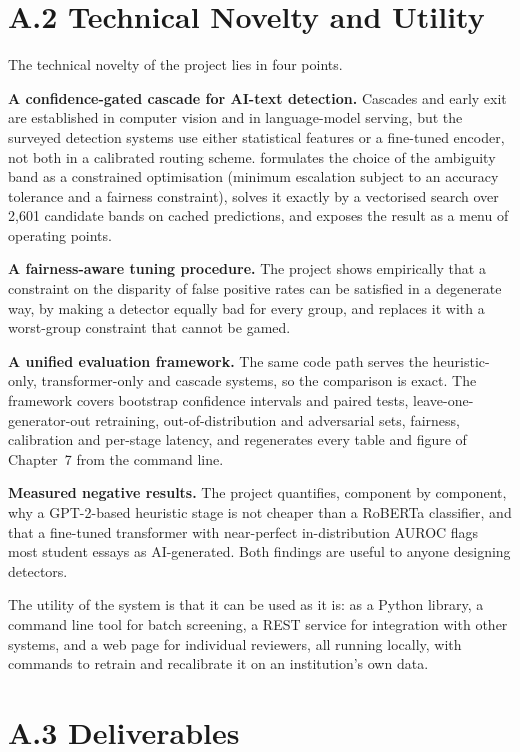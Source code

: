 \section*{A.2 Technical Novelty and Utility}

The technical novelty of the project lies in four points.

\textbf{A confidence-gated cascade for AI-text detection.} Cascades and early
exit are established in computer vision and in language-model serving, but the
surveyed detection systems use either statistical features or a fine-tuned
encoder, not both in a calibrated routing scheme. \veriscript{} formulates the
choice of the ambiguity band as a constrained optimisation (minimum escalation
subject to an accuracy tolerance and a fairness constraint), solves it exactly
by a vectorised search over 2,601 candidate bands on cached predictions, and
exposes the result as a menu of operating points.

\textbf{A fairness-aware tuning procedure.} The project shows empirically that a
constraint on the disparity of false positive rates can be satisfied in a
degenerate way, by making a detector equally bad for every group, and replaces
it with a worst-group constraint that cannot be gamed.

\textbf{A unified evaluation framework.} The same code path serves the
heuristic-only, transformer-only and cascade systems, so the comparison is exact.
The framework covers bootstrap confidence intervals and paired tests,
leave-one-generator-out retraining, out-of-distribution and adversarial sets,
fairness, calibration and per-stage latency, and regenerates every table and
figure of Chapter~7 from the command line.

\textbf{Measured negative results.} The project quantifies, component by
component, why a GPT-2-based heuristic stage is not cheaper than a RoBERTa
classifier, and that a fine-tuned transformer with near-perfect in-distribution
AUROC flags most student essays as AI-generated. Both findings are useful to
anyone designing detectors.

The utility of the system is that it can be used as it is: as a Python library,
a command line tool for batch screening, a REST service for integration with
other systems, and a web page for individual reviewers, all running locally,
with commands to retrain and recalibrate it on an institution's own data.

\section*{A.3 Deliverables}

